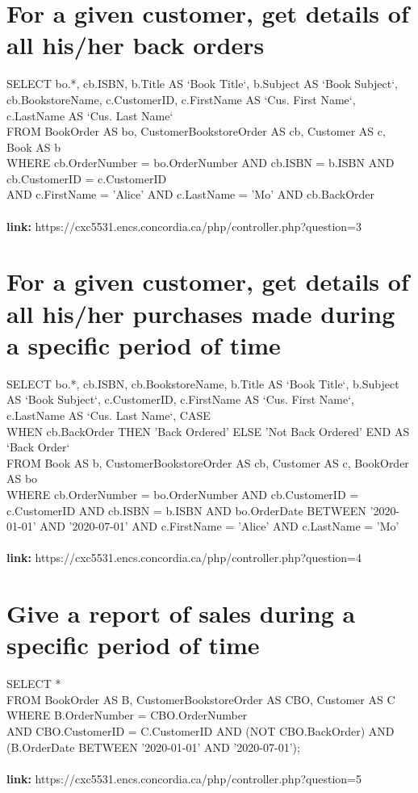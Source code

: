 \documentclass{scrreprt}
\begin{document}
\section{For a given customer, get details of all his/her back orders}
 SELECT bo.*, cb.ISBN, b.Title AS `Book Title`, b.Subject AS `Book Subject`, cb.BookstoreName, c.CustomerID, c.FirstName AS `Cus. First Name`, c.LastName AS `Cus. Last Name`\\
        FROM BookOrder AS bo, CustomerBookstoreOrder AS cb, Customer AS c, Book AS b\\
        WHERE cb.OrderNumber = bo.OrderNumber AND cb.ISBN = b.ISBN AND cb.CustomerID = c.CustomerID\\
        AND c.FirstName = 'Alice' AND c.LastName = 'Mo' AND cb.BackOrder  
\\\\\textbf{link:} https://cxc5531.encs.concordia.ca/php/controller.php?question=3
\section{For a given customer, get details of all his/her purchases made during a specific period of time}
SELECT bo.*, cb.ISBN, cb.BookstoreName, b.Title AS `Book Title`, b.Subject AS `Book Subject`,
            c.CustomerID, c.FirstName AS `Cus. First Name`, c.LastName AS `Cus. Last Name`,
            CASE\\
            WHEN cb.BackOrder THEN 'Back Ordered' ELSE 'Not Back Ordered'
            END AS `Back Order`\\
            FROM Book AS b, CustomerBookstoreOrder AS cb, Customer AS c, BookOrder\\
            AS bo \\WHERE cb.OrderNumber = bo.OrderNumber AND cb.CustomerID = c.CustomerID
            AND cb.ISBN = b.ISBN AND bo.OrderDate BETWEEN '2020-01-01' AND '2020-07-01'
            AND c.FirstName = 'Alice' AND c.LastName = 'Mo'  
\\\\\textbf{link:} https://cxc5531.encs.concordia.ca/php/controller.php?question=4
\section{Give a report of sales during a specific period of time}
 SELECT *\\
            FROM BookOrder AS B,
            CustomerBookstoreOrder AS CBO,
            Customer AS C
            WHERE B.OrderNumber = CBO.OrderNumber\\
            AND CBO.CustomerID = C.CustomerID
            AND (NOT CBO.BackOrder)
            AND (B.OrderDate BETWEEN '2020-01-01' AND '2020-07-01');  
\\\\\textbf{link:} https://cxc5531.encs.concordia.ca/php/controller.php?question=5
\end{document}
